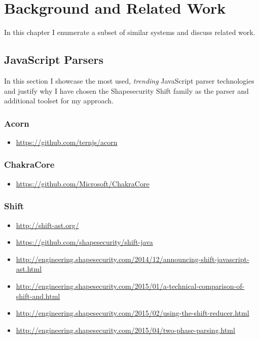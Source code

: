 \chapter{Background and Related Work}
\label{chap:background-and-related-work}

In this chapter I enumerate a subset of similar systems and discuss related work.

\section{JavaScript Parsers}
\label{sect:javascript-parsers}
In this section I showcase the most used, \emph{trending} JavaScript parser technologies and justify why I have chosen the Shapesecurity Shift family as the parser and additional toolset for my approach.

\subsection{Acorn}
\begin{itemize}
	\item \url{https://github.com/ternjs/acorn}
\end{itemize}


\subsection{ChakraCore}
\begin{itemize}
	\item \url{https://github.com/Microsoft/ChakraCore}
\end{itemize}


\subsection{Shift}
\begin{itemize}
	\item \url{http://shift-ast.org/}
	\item \url{https://github.com/shapesecurity/shift-java}
	\item \url{http://engineering.shapesecurity.com/2014/12/announcing-shift-javascript-ast.html}
	\item \url{http://engineering.shapesecurity.com/2015/01/a-technical-comparison-of-shift-and.html}
	\item \url{http://engineering.shapesecurity.com/2015/02/using-the-shift-reducer.html}
	\item \url{http://engineering.shapesecurity.com/2015/04/two-phase-parsing.html}
\end{itemize}

